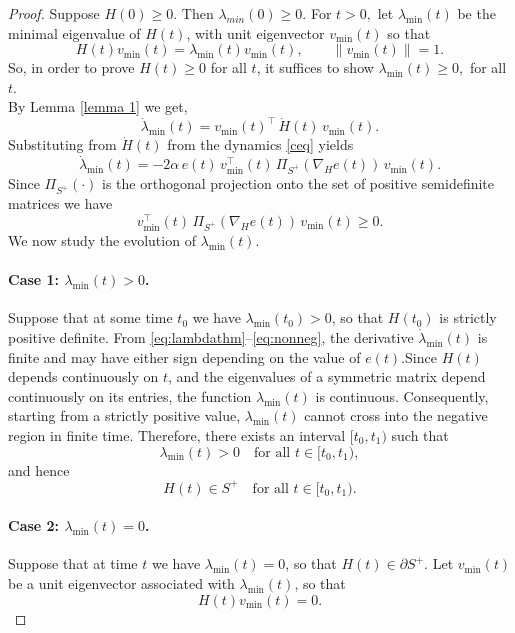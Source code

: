 \documentclass[reqno]{amsart}
\numberwithin{equation}{section}
\begin{document}
\begin{proof} Suppose $H(0) \geq 0.$ Then   $  \lambda_{min}(0) \geq 0.$ For $t>0 ,$ let $\lambda_{\min}(t)$ be the minimal eigenvalue of $H(t)$, with unit eigenvector
$v_{\min}(t)$ so that
\[
H(t)v_{\min}(t)=\lambda_{\min}(t)v_{\min}(t), 
\qquad \|v_{\min}(t)\|=1.
\] So, in order to prove $H(t)\geq 0$ for all $t$, it suffices to show  $\lambda_{\min}(t) \geq 0,$ for all $t.$\\
 By Lemma \eqref{lemma 1} we get,
\begin{equation}
\dot\lambda_{\min}(t)
= v_{\min}(t)^{\!\top}\, \dot H(t)\, v_{\min}(t).
\label{eq:lambdaderivative}
\end{equation}
Substituting from $\dot H(t)$ from the dynamics \eqref{ceq} yields
\begin{equation}
\dot\lambda_{\min}(t)
= -2\alpha\, e(t)\,
v_{\min}^{\!\top}(t)\, 
\Pi_{S^+}(\nabla_H e(t))\, 
v_{\min}(t).
\label{eq:lambdathm}
\end{equation}
Since $\Pi_{S^+}(\cdot)$ is the orthogonal projection onto the set of positive semidefinite matrices we have
\begin{equation}
v_{\min}^{\!\top}(t)\,
\Pi_{S^+}(\nabla_H e(t))\,
v_{\min}(t)
\ge 0.
\label{eq:nonneg}
\end{equation}
We now study the evolution of $\lambda_{\min}(t)$.\\

\paragraph{Case 1: $\lambda_{\min}(t) > 0$.}
Suppose that at some time $t_0$ we have $\lambda_{\min}(t_0) > 0$, so that $H(t_0)$ is strictly positive definite.  
From \eqref{eq:lambdathm}--\eqref{eq:nonneg}, the derivative $\dot{\lambda}_{\min}(t)$ is finite and may have either sign depending on the value of $e(t)$.Since $H(t)$ depends continuously on $t$, and the eigenvalues of a symmetric matrix depend continuously on its entries, the function $\lambda_{\min}(t)$ is continuous. Consequently, starting from a strictly positive value, $\lambda_{\min}(t)$ cannot cross into the negative region in finite time. Therefore, there exists an interval $[t_0,t_1)$ such that
\[
\lambda_{\min}(t) > 0 \quad \text{for all } t \in [t_0,t_1),
\]
and hence
\[
H(t) \in S^+ \quad \text{for all } t \in [t_0,t_1).
\]
 
\paragraph{Case 2: $\lambda_{\min}(t) = 0$.}
Suppose that at time $t$ we have $\lambda_{\min}(t)=0$, so that
$H(t)\in \partial S^+$. Let $v_{\min}(t)$ be a unit eigenvector
associated with $\lambda_{\min}(t)$, so that
\[
H(t)v_{\min}(t)=0.
\]


\end{proof}
\end{document}
